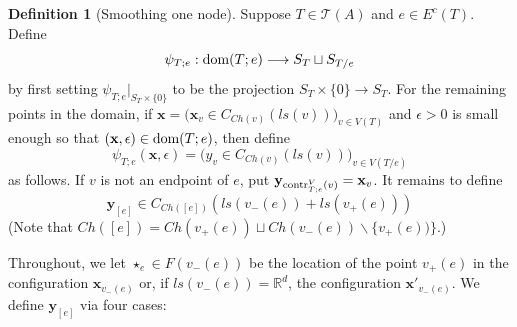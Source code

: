 \documentclass[11pt]{article}
\theoremstyle{definition}
\newtheorem{dfn}[thm]{Definition}
\theoremstyle{remark}
\def\R{\mathbb{R}}
\def\cT{\mathcal{T}}
\def\dom{{\tn{dom}}}
\def\Ch{{{Ch}}}
\def\bx{\mathbf{x}}
\def\by{\mathbf{y}}
\def\tn#1{\textnormal{#1}}
\def\x{\!\times\!}
\begin{document}
\begin{dfn}[Smoothing one node]
\label{D:smooth-one-node}
Suppose $T\in\cT(A)$ and $e\in E^c(T)$. 
Define 
\[
\psi_{T;e}: \dom(T;e)\longrightarrow S_T\sqcup S_{T/e}
\]
by first setting $\psi_{T;e}|_{S_T\times \{0\}}$ to be the projection $S_T \x \{0\} \to S_T$. 
For the remaining points in the domain, if $\bx=\big(\bx_v\in C_{\Ch(v)}(ls(v))\big)_{v\in V(T)}$ and $\epsilon>0$ is small enough so that 
$(\bx,\epsilon) \in \dom(T;e)$, then define 
\[
\psi_{T;e}(\bx,\epsilon)=\big(y_v\in C_{\Ch(v)}(ls(v))\big)_{v\in V(T/e)}
\]
as follows.
If $v$ is not an endpoint of $e$, put $\by_{\tn{contr}^V_{T;e}(v)}=\bx_v$.  It remains to define 
\[
\by_{[e]}\in C_{\Ch([e])}(ls(v_-(e))+ls(v_+(e)))
\]
(Note that $\Ch([e])=\Ch(v_+(e))\sqcup \Ch(v_-(e)) \backslash \{v_+(e))\}$.)

Throughout, we let $\star_e \in F(v_-(e))$ be the location of the point $v_+(e)$ in the configuration $\bx_{v_-(e)}$ or, if $ls(v_-(e))=\R^d$, the configuration $\bx'_{v_-(e)}$.
We define $\by_{[e]}$ via four cases:


\end{dfn}
\end{document}
